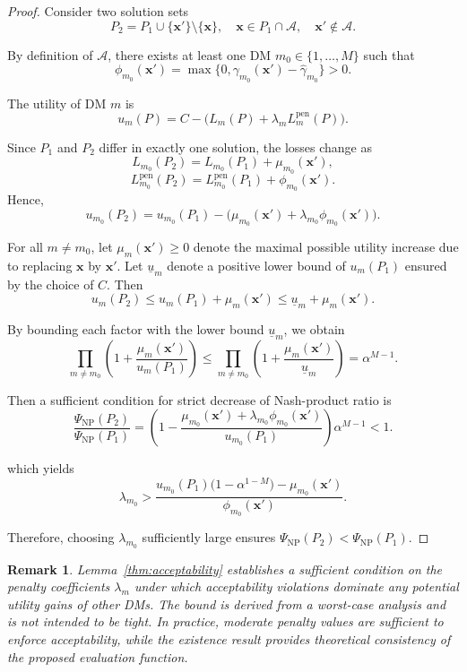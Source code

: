 \documentclass[journal]{IEEEtran}
\newtheorem{remark}{Remark}
\begin{document}
\begin{proof}
	Consider two solution sets
	\[
	P_2 = P_1 \cup \{\mathbf{x}'\} \setminus \{\mathbf{x}\},
	\quad
	\mathbf{x} \in P_1 \cap \mathcal{A},
	\quad
	\mathbf{x}' \notin \mathcal{A}.
	\]
	
	By definition of $\mathcal{A}$, there exists at least one DM $m_0 \in \{1,\dots,M\}$ such that
	\[
	\phi_{m_0}(\mathbf{x}') = \max\{0, \gamma_{m_0}(\mathbf{x}') - \hat{\gamma}_{m_0}\} > 0.
	\]
	
	The utility of DM $m$ is
	\[
	u_m(P) = C - \big(L_m(P) + \lambda_m L_m^{\mathrm{pen}}(P)\big).
	\]
	
	Since $P_1$ and $P_2$ differ in exactly one solution, the losses change as
	\[
	L_{m_0}(P_2) = L_{m_0}(P_1) + \mu_{m_0}(\mathbf{x}'),
	\]
	\[
	L_{m_0}^{\mathrm{pen}}(P_2) = L_{m_0}^{\mathrm{pen}}(P_1) + \phi_{m_0}(\mathbf{x}').
	\]
	Hence,
	\begin{equation}
		\label{eq:u_m0_diff}
		u_{m_0}(P_2) = u_{m_0}(P_1) - \big(\mu_{m_0}(\mathbf{x}') + \lambda_{m_0} \phi_{m_0}(\mathbf{x}')\big).
	\end{equation}
	
	For all $m \neq m_0$, let $\mu_m(\mathbf{x}') \ge 0$ denote the maximal possible utility increase due to replacing $\mathbf{x}$ by $\mathbf{x}'$. Let $\underline{u}_m$ denote a positive lower bound of $u_m(P_1)$ ensured by the choice of $C$. Then
	\[
	u_m(P_2) \le u_m(P_1) + \mu_m(\mathbf{x}') \le \underline{u}_m + \mu_m(\mathbf{x}').
	\]
	
	By bounding each factor with the lower bound $\underline{u}_m$, we obtain
	\[
	\prod_{m \neq m_0} \left(1 + \frac{\mu_m(\mathbf{x}')}{u_m(P_1)}\right)
	\le \prod_{m \neq m_0} \left(1 + \frac{\mu_m(\mathbf{x}')}{\underline{u}_m}\right)
	= \alpha^{M-1}.
	\]
	
	Then a sufficient condition for strict decrease of Nash-product ratio is
	\[
	\frac{\Psi_{\mathrm{NP}}(P_2)}{\Psi_{\mathrm{NP}}(P_1)}
	=
	\left(1-\frac{\mu_{m_0}(\mathbf{x}') + \lambda_{m_0} \phi_{m_0}(\mathbf{x}')}{u_{m_0}(P_1)}\right)
	\alpha^{M-1} < 1.
	\]
	
	which yields
	\[
	\lambda_{m_0} > \frac{u_{m_0}(P_1) \big(1 - \alpha^{1-M}\big) - \mu_{m_0}(\mathbf{x}')}{\phi_{m_0}(\mathbf{x}')}.
	\]
	
	Therefore, choosing $\lambda_{m_0}$ sufficiently large ensures
	$\Psi_{\mathrm{NP}}(P_2) < \Psi_{\mathrm{NP}}(P_1)$.
\end{proof}

\begin{remark}
	Lemma~\ref{thm:acceptability} establishes a sufficient condition on the penalty coefficients $\lambda_m$ under which acceptability violations dominate any potential utility gains of other DMs.
	The bound is derived from a worst-case analysis and is not intended to be tight.
	In practice, moderate penalty values are sufficient to enforce acceptability, while the existence result provides theoretical consistency of the proposed evaluation function.
\end{remark}
\end{document}
